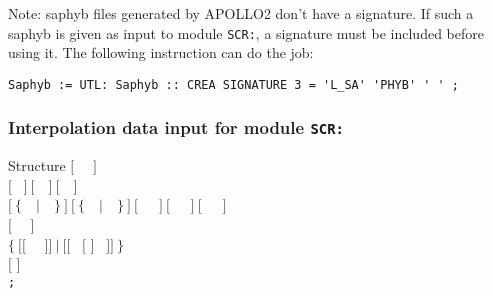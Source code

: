 Note: {\sc saphyb} files generated by APOLLO2 don't have a signature. If such a {\sc saphyb} is given as input
to module {\tt SCR:}, a signature must be included before using it. The following instruction
can do the job:
\begin{verbatim}
Saphyb := UTL: Saphyb :: CREA SIGNATURE 3 = 'L_SA' 'PHYB' ' ' ;
\end{verbatim}

\subsubsection{Interpolation data input for module {\tt SCR:}}\label{sect:descscr}

\vskip -0.5cm

\begin{DataStructure}{Structure }
$[$~ ~$]$ \\
$[$~ $]~[$~~$]~[$~~$]$ \\
$[~\{$~~$|$~~$\}~]~[~\{$~~$|$~~$\}~]~[$~~~$]~[$~~~$]~[$~~~$]$ \\
$[$~ ~$]$ \\
$\{~[[$~  ~$]]~|~[[$~  $[$  $]$  ~$]]~\}$ \\
$[$  $]$ \\
{\tt ;}
\end{DataStructure}

